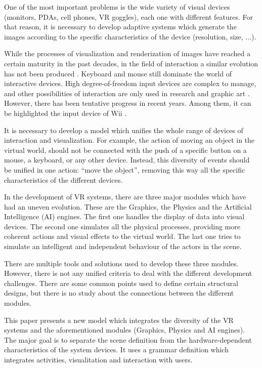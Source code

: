 \documentclass[10pt,journal,letterpaper,compsoc]{IEEEtran}
\begin{document}
One of the most important problems is the wide variety of visual devices (monitors, PDAs, cell
phones, VR goggles), each one with different features. For that reason, it is necessary to develop
adaptive systems which generate the images according to the specific characteristics of the device
(resolution, size, ...).

While the processes of visualization and renderization of images have reached a certain maturity in
the past decades, in the field of interaction a similar evolution has not been produced
\cite{Joshua2004,David2005}. Keyboard and mouse still dominate the world of interactive devices.
High degree-of-freedom input devices are complex to manage, and other possibilities of interaction
are only used in research and graphic art \cite{Joshua2004}. However, there has been tentative
progress in recent years. Among them, it can be highlighted the input device of Wii
\cite{wiiNintendo}.

It is necessary to develop a model which unifies the whole range of devices of interaction and
visualization. For example, the action of moving an object in the virtual world, should not be
connected with the push of a specific button on a mouse, a keyboard, or any other device. Instead,
this diversity of events should be unified in one action: ``move the object'', removing this way
all the specific characteristics of the different devices.

In the development of VR systems, there are three major modules which have had an uneven evolution. These are the Graphics, the Physics and the Artificial Intelligence (AI) engines. The first one handles the display of data into visual devices. The second one simulates all the physical processes, providing more coherent actions and visual effects to the virtual world. The last one tries to simulate an intelligent and independent behaviour of the actors in the scene.

There are multiple tools and solutions used to develop these three modules. However, there is not any unified criteria to deal with the different development challenges. There are some common points used to define certain structural designs, but there is no study about the connections between the different modules.

This paper presents a new model which integrates the diversity of the VR systems and the
aforementioned modules (Graphics, Physics and AI engines). The major goal is to
separate the scene definition from the hardware-dependent characteristics of the system devices. It
uses a grammar definition which integrates activities, visualitation and interaction with users.
\end{document}
